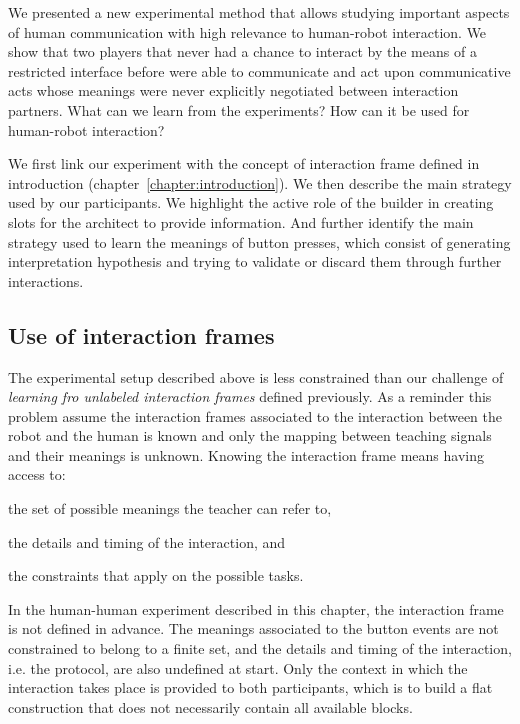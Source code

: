 We presented a new experimental method that allows studying important aspects of human communication with high relevance to human-robot interaction. We show that two players that never had a chance to interact by the means of a restricted interface before were able to communicate and act upon communicative acts whose meanings were never explicitly negotiated between interaction partners. What can we learn from the experiments? How can it be used for human-robot interaction?

We first link our experiment with the concept of interaction frame defined in introduction (chapter~\ref{chapter:introduction}). We then describe the main strategy used by our participants. We highlight the active role of the builder in creating slots for the architect to provide information. And further identify the main strategy used to learn the meanings of button presses, which consist of generating interpretation hypothesis and trying to validate or discard them through further interactions. 


\subsection{Use of interaction frames}
\label{chapter:humanexperiment:frames}

The experimental setup described above is less constrained than our challenge of \emph{learning fro unlabeled interaction frames} defined previously. As a reminder this problem assume the interaction frames associated to the interaction between the robot and the human is known and only the mapping between teaching signals and their meanings is unknown. Knowing the interaction frame means having access to: \begin{inparaenum}[(a)] \item the set of possible meanings the teacher can refer to, \item the details and timing of the interaction, and \item the constraints that apply on the possible tasks. \end{inparaenum}

In the human-human experiment described in this chapter, the interaction frame is not defined in advance. The meanings associated to the button events are not constrained to belong to a finite set, and the details and timing of the interaction, i.e. the protocol, are also undefined at start. Only the context in which the interaction takes place is provided to both participants, which is to build a flat construction that does not necessarily contain all available blocks.

